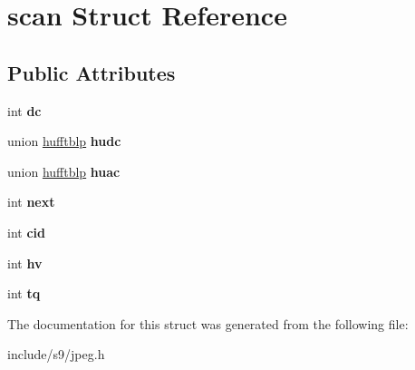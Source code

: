 \hypertarget{structscan}{\section{scan \-Struct \-Reference}
\label{structscan}
}
\subsection*{\-Public \-Attributes}
\begin{DoxyCompactItemize}
\item 
\hypertarget{structscan_a20d568126824e658b8d2a6db9dc875d1}{int {\bfseries dc}}\label{structscan_a20d568126824e658b8d2a6db9dc875d1}

\item 
\hypertarget{structscan_a4b18d515c95ecc74e15817074b051c4a}{union \hyperlink{unionhufftblp}{hufftblp} {\bfseries hudc}}\label{structscan_a4b18d515c95ecc74e15817074b051c4a}

\item 
\hypertarget{structscan_a39a7e1934b1342b6ff7ebf4f534d3577}{union \hyperlink{unionhufftblp}{hufftblp} {\bfseries huac}}\label{structscan_a39a7e1934b1342b6ff7ebf4f534d3577}

\item 
\hypertarget{structscan_a8fd802c04255c5f43e0f32fcfff92347}{int {\bfseries next}}\label{structscan_a8fd802c04255c5f43e0f32fcfff92347}

\item 
\hypertarget{structscan_a7df1db52d97afc270327e9eafdc65389}{int {\bfseries cid}}\label{structscan_a7df1db52d97afc270327e9eafdc65389}

\item 
\hypertarget{structscan_ad6747bd586ec218de4d8dc7ee08c0204}{int {\bfseries hv}}\label{structscan_ad6747bd586ec218de4d8dc7ee08c0204}

\item 
\hypertarget{structscan_ac3b43ed80ff59736df9f7d63c68048fc}{int {\bfseries tq}}\label{structscan_ac3b43ed80ff59736df9f7d63c68048fc}

\end{DoxyCompactItemize}


\-The documentation for this struct was generated from the following file\-:\begin{DoxyCompactItemize}
\item 
include/s9/jpeg.\-h\end{DoxyCompactItemize}
